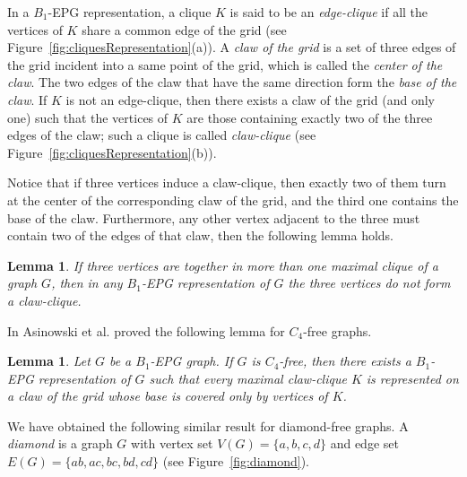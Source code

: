 \documentclass[9pt]{entcs}
\newtheorem{lema}[thm]{Lemma}%
\begin{document}
In  a $B_1$-EPG representation, a clique $K$  is said to be
 an \textit{edge-clique} if all  the vertices of $K$ share a common edge of the grid (see Figure~\ref{fig:cliquesRepresentation}(a)).
 A \textit{claw of the grid} is a set of three edges of the grid incident into a same point of the grid, which is called
  the \textit{center of the claw}. The two edges of the claw that have the same direction form
    the \textit{ base of the claw}. If $K$ is not an edge-clique, then there exists
    a claw of the grid (and only one) such that  the vertices of $K$ are those containing exactly two of the three edges of the claw; such a  clique is called  \textit{claw-clique} \cite{golumbic2009} (see Figure~\ref{fig:cliquesRepresentation}(b)).

    
    

Notice that if three vertices induce a claw-clique, then exactly two of them turn at the center of the corresponding  claw of the grid, and the third one contains the
base of the claw. 
Furthermore, any other vertex  adjacent to the three  must contain two of the edges of that claw, then the following lemma holds.

\begin{lema}\label{lem:cliquesMaximais}
If three vertices are together  in more than one maximal clique of a graph $G$, then in
any $B_1$-EPG representation of $G$ the three vertices do not form a claw-clique. %
\end{lema}



In \cite{ries2009} Asinowski et al. proved the following lemma for $C_4$-free graphs.

\begin{lema} \cite{ries2009} \label{lem:lemaBRies2009}
Let $G$ be a $B_1$-EPG graph. If $G$ is $C_4$-free, then there exists a $B_1$-EPG representation of $G$ such that every  maximal claw-clique $K$ is represented on a claw of the grid whose base is covered only by vertices of $K$.
\end{lema}


We have obtained the following similar result for diamond-free graphs. A \textit{diamond} is a graph $G$ with vertex set $V(G) = \{a, b, c, d\}$ and edge set $E(G)=\{ab, ac,bc, bd,cd\}$ (see Figure~\ref{fig:diamond}). %
\end{document}
